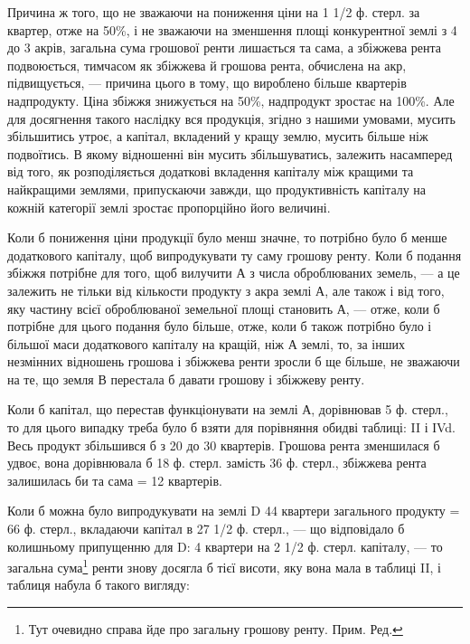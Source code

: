 Причина ж того, що не зважаючи на пониження ціни на 1 1/2 ф. стерл.
за квартер, отже на 50\%, і не зважаючи на зменшення площі конкурентної
землі з 4 до 3 акрів, загальна сума грошової ренти лишається та сама, а збіжжева
рента подвоюється, тимчасом як збіжжева й грошова рента, обчислена на акр, підвищується,
— причина цього в тому, що вироблено більше квартерів надпродукту.
Ціна збіжжя знижується на 50\%, надпродукт зростає на 100\%.
Але для досягнення такого наслідку вся продукція, згідно з нашими умовами,
мусить збільшитись утроє, а капітал, вкладений у кращу землю, мусить більше
ніж подвоїтись. В якому відношенні він мусить збільшуватись, залежить насамперед
від того, як розподіляється додаткові вкладення капіталу між кращими та
найкращими землями, припускаючи завжди, що продуктивність капіталу на
кожній категорії землі зростає пропорційно його величині.

Коли б пониження ціни продукції було менш значне, то потрібно було б
менше додаткового капіталу, щоб випродукувати ту саму грошову ренту. Коли б
подання збіжжя потрібне для того, щоб вилучити А з числа оброблюваних земель,
— а це залежить не тільки від кількости продукту з акра землі А, але
також і від того, яку частину всієї оброблюваної земельної площі становить А, —
отже, коли б потрібне для цього подання було більше, отже, коли б також
потрібно було і більшої маси додаткового капіталу на кращій, ніж А землі, то,
за інших незмінних відношень грошова і збіжжева ренти зросли б ще більше,
не зважаючи на те, що земля В перестала б давати грошову і збіжжеву ренту.

Коли б капітал, що перестав функціонувати на землі А, дорівнював 5 ф.
стерл., то для цього випадку треба було б взяти для порівняння обидві таблиці:
II і ІVd. Весь продукт збільшився б з 20 до 30 квартерів. Грошова рента
зменшилася б удвоє, вона дорівнювала б 18 ф. стерл. замість 36 ф. стерл.,
збіжжева рента залишилась би та сама = 12 квартерів.

Коли б можна було випродукувати на землі D 44 квартери загального
продукту = 66 ф. стерл., вкладаючи капітал в 27 1/2 ф. стерл., — що відповідало б
колишньому припущенню для D: 4 квартери на 2 1/2 ф. стерл. капіталу, —
то загальна сума\footnote*{
Тут очевидно справа йде про загальну грошову ренту. Прим. Ред.
} ренти знову досягла б тієї висоти, яку вона мала в таблиці
II, і таблиця набула б такого вигляду:

